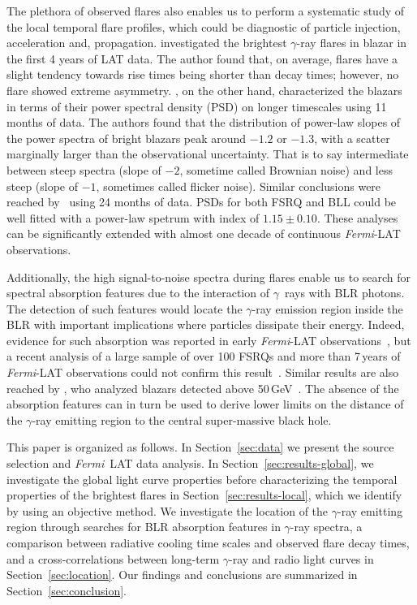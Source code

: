 \documentclass[twocolumn,linenumbers]{aastex62}
\newcommand{\Grays}{$\gamma$~rays\xspace}
\newcommand{\gray}{$\gamma$-ray\xspace}
\newcommand{\FermiLAT}{\emph{Fermi}~LAT\xspace}
\newcommand{\fermiLAT}{\emph{Fermi}-LAT\xspace}
\begin{document}
The plethora of observed flares also enables us to perform a systematic study of the local temporal flare profiles, which could be diagnostic of particle injection, acceleration and, propagation.
\citet{2013MNRAS.430.1324N} investigated the brightest \gray flares in blazar in the first 4 years of LAT data.
The author found that, on average, flares have a slight tendency towards rise times being shorter than decay times; however, no flare showed extreme asymmetry. 
\citet{2010ApJ...722..520A}, on the other hand, characterized the blazars in terms of their power spectral density (PSD) on longer timescales using 11 months of data.
The authors found that the distribution of power-law slopes of the power spectra of bright blazars peak around $-1.2$ or $-1.3$, with a scatter marginally larger than the observational uncertainty.  That is to say intermediate between steep spectra (slope of $-2$, sometime called Brownian noise) and less steep (slope of $-1$, sometimes called flicker noise).
Similar conclusions were reached by~\citet{2LAC} using 24 months of data. PSDs for both FSRQ and BLL could be well fitted with a power-law spetrum with index of $1.15\pm0.10$.
These analyses can be significantly extended with almost one decade of continuous \fermiLAT observations.

Additionally, the high signal-to-noise spectra during flares enable us to search for spectral absorption features due to the interaction of \Grays with BLR photons.
The detection of such features would locate the \gray emission region inside the BLR with important implications where particles dissipate their energy. 
Indeed, evidence for such absorption was reported in early  \fermiLAT observations~\citep{2010ApJ...717L.118P,2014ApJ...794....8S}, but a recent analysis of a large sample of over 100 FSRQs and more than 7\,years of \fermiLAT observations could not confirm this result~\citep{2018MNRAS.477.4749C}.
Similar results are also reached by \citet{2019arXiv190103494V}, who analyzed blazars detected above 50\,GeV~\citep{2016ApJS..222....5A}.
The absence of the absorption features can in turn be used to derive lower limits on the distance of the \gray emitting region to the central super-massive black hole. 

This paper is organized as follows. 
In Section~\ref{sec:data} we present the source selection and \FermiLAT data analysis.
In Section~\ref{sec:results-global}, we investigate the global light curve properties before characterizing the temporal properties of the brightest flares in Section~\ref{sec:results-local}, which we identify by using an objective method.
We investigate the location of the \gray emitting region through searches for BLR absorption features in \gray spectra, a comparison between radiative cooling time scales and observed flare decay times, and a cross-correlations between long-term \gray and radio light curves in Section~\ref{sec:location}. 
Our findings and conclusions are summarized in Section~\ref{sec:conclusion}.
\end{document}
